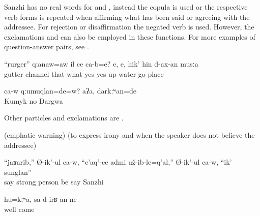 Sanzhi has no real words for  and , instead the copula  is used or the respective verb forms is repeated when affirming what has been said or agreeing with the addressee. For rejection or disaffirmation the negated verb is used. However, the exclamations   and   can also be employed in these functions. For more examples of question-answer pairs, see .
%
\begin{exe}
	\ex	\label{ex:‎Gutter (ruger), this is a channel or what is it? Yes, the place where the water runs (to the water mill) minor}
	\gll	``rurger''	qːanaw=aw	il	ce	ca-b=e? e,	e,	hik'	hin	d-ax-an	musːa\\
		gutter	channel	that	what		yes	yes	up	water	go	place\\
	\glt	{}

	\ex	\label{ex:‎‎‎Was he himself Kumyk? ‎‎No, he was Dargi minor}
	\gll	ca-w	qːumuqlan=de=w?	aʔa,	darkːʷan=de\\
			Kumyk	no	Dargwa\\
	\glt	{}
\end{exe}

Other particles and exclamations are .
%
\begin{exe}
	\ex	\label{ex:exclamations minor}
	\begin{xlist}
		\ex	{} 	
		\ex	{} 	
		\ex	{} 	
		\ex	{}  (emphatic warning)	
		\ex	{}  (to express irony and when the speaker does not believe the addressee)	
	\end{xlist}

	\ex	\label{ex:‎Oh, it turned out that the Sanzhi person is such a strong man, he says minor}
	\gll	``jaʁarib,''	Ø-ik'-ul ca-w,	``c'aq'-ce	admi	už-ib-le=q'al,''	Ø-ik'-ul ca-w,	``ik'	sunglan''\\
			say		strong	person	be	say			Sanzhi\\
	\glt	{}

	\ex	\label{ex:Well, (whatever, it does not matter), they will come (another day) minor}
	\gll	hu=kːʷa,	sa-d-irʁ-an-ne\\
		well	come\\
	\glt	{}
\end{exe}

